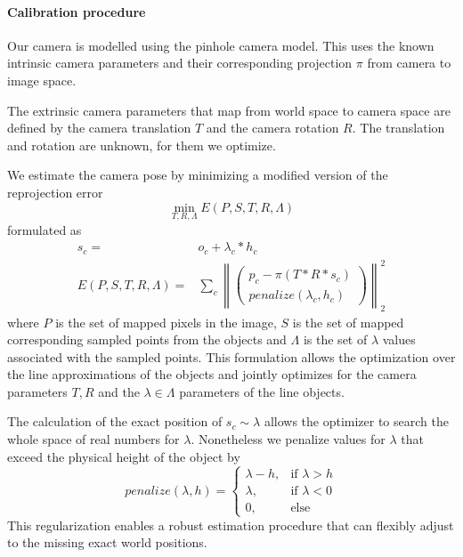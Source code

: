 
\paragraph{Calibration procedure}
  
Our camera is modelled using the pinhole camera model. 
This uses the known intrinsic camera parameters and their corresponding projection $\pi$ from camera to image space.

The extrinsic camera parameters that map from world space to camera space are defined by the camera translation $T$ and the camera rotation $R$.
The translation and rotation are unknown, for them we optimize. 

We estimate the camera pose by minimizing a modified version of the reprojection error 
\begin{equation}
  \min_{T, R, \Lambda} E(P, S, T, R, \Lambda) 
\end{equation}
formulated as
\begin{equation}
  \begin{split}
    s_c =& o_c + \lambda_c * h_c \\
  E(P, S, T, R, \Lambda ) =& 
  \sum_{c} 
  \left\lVert 
  \begin{pmatrix}
    p_c - \pi(T * R * s_c)\\
    penalize(\lambda_c, h_c)
  \end{pmatrix}
  \right\rVert_2^2 
\end{split}
\end{equation}
where $P$ is the set of mapped pixels in the image, $S$ is the set of mapped corresponding sampled points from the objects and $\Lambda$ is the set of $\lambda$ values associated with the sampled points.
This formulation allows the optimization over the line approximations of the objects and jointly optimizes for the camera parameters $T, R$ and the $\lambda \in \Lambda$ parameters of the line objects.

The calculation of the exact position of $s_c \sim \lambda$ allows the optimizer to search the whole space of real numbers for $\lambda$.
Nonetheless we penalize values for $\lambda$ that exceed the physical height of the object by 
\begin{equation}
    penalize(\lambda, h) =
    \begin{cases}
      \lambda - h,& \text{if } \lambda > h\\
      \lambda,    & \text{if } \lambda < 0\\
      0,    & \text{else}
    \end{cases} 
\end{equation}
This regularization enables a robust estimation procedure that can flexibly adjust to the missing exact world positions.

